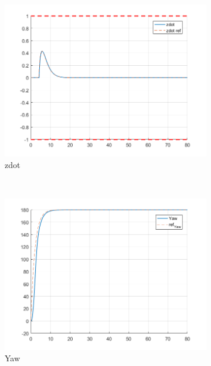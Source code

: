 \documentclass[11pt]{article}
\begin{document}
\begin{enumerate}
\begin{figure}[ht]
        \begin{subfigure}[c]{0.3\linewidth}
            \centering
            \includegraphics[width=\linewidth]{Plots_13_NonlinearModel_Lemniscate/04}
            \caption{zdot}
        \end{subfigure}
        ~
        \begin{subfigure}[c]{0.3\linewidth}
            \centering
            \includegraphics[width=\linewidth]{Plots_13_NonlinearModel_Lemniscate/05}
            \caption{Yaw}
        \end{subfigure}
        ~
        \begin{subfigure}[c]{0.3\linewidth}
            \centering

\end{subfigure}
\end{figure}
\end{enumerate}
\end{document}
